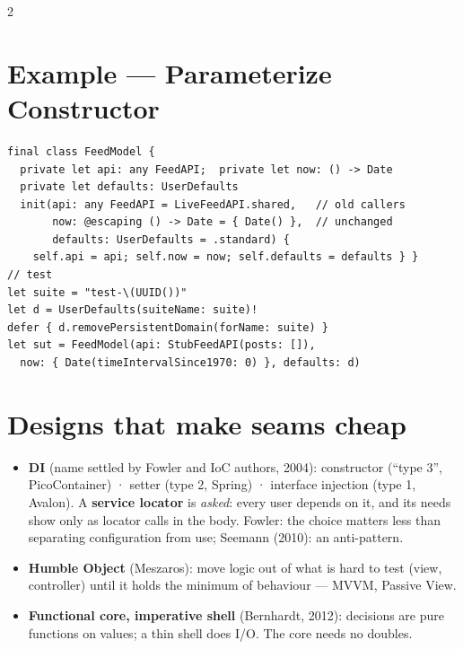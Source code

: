 \documentclass[8pt]{extarticle}
\begin{document}
\begin{multicols}{2}
\section{Example — Parameterize Constructor}
\begin{lstlisting}[language=SwiftSheet]
final class FeedModel {
  private let api: any FeedAPI;  private let now: () -> Date
  private let defaults: UserDefaults
  init(api: any FeedAPI = LiveFeedAPI.shared,   // old callers
       now: @escaping () -> Date = { Date() },  // unchanged
       defaults: UserDefaults = .standard) {
    self.api = api; self.now = now; self.defaults = defaults } }
// test
let suite = "test-\(UUID())"
let d = UserDefaults(suiteName: suite)!
defer { d.removePersistentDomain(forName: suite) }
let sut = FeedModel(api: StubFeedAPI(posts: []),
  now: { Date(timeIntervalSince1970: 0) }, defaults: d)
\end{lstlisting}

\section{Designs that make seams cheap}
\begin{itemize}
  \item \textbf{DI} (name settled by Fowler and IoC authors, 2004): constructor (``type 3'', PicoContainer) · setter
        (type 2, Spring) · interface injection (type 1, Avalon). A \textbf{service locator} is
        \emph{asked}: every user depends on it, and its needs show only as locator calls in the
        body. Fowler: the choice matters less than separating configuration from use; Seemann
        (2010): an anti-pattern.
  \item \textbf{Humble Object} (Meszaros): move logic out of what is hard to test (view,
        controller) until it holds the minimum of behaviour — MVVM, Passive View.
  \item \textbf{Functional core, imperative shell} (Bernhardt, 2012): decisions are pure
        functions on values; a thin shell does I/O. The core needs no doubles.
\end{itemize}

\end{multicols}

\end{document}
